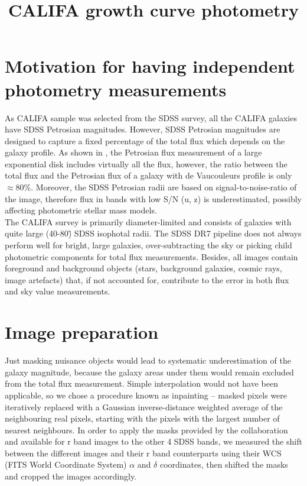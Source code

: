 \documentclass[apj, onecolumn]{emulateapj}
\title{CALIFA growth curve photometry}
\begin{document}
\maketitle
\section*{Motivation for having independent photometry measurements}

As CALIFA sample was selected from the SDSS survey, all the CALIFA galaxies have SDSS Petrosian magnitudes. However, SDSS Petrosian magnitudes are designed to capture a fixed percentage of the total flux which depends on the galaxy profile. As shown in \cite{Blanton2001}, the Petrosian flux measurement of a large exponential disk includes virtually all the flux, however, the ratio between the total flux and the Petrosian flux of a galaxy with de Vaucouleurs profile is only $\approx$80\%. Moreover, the SDSS Petrosian radii are based on signal-to-noise-ratio of the image, therefore flux in bands with low S/N (u, z) is underestimated, possibly affecting photometric stellar mass models.\\

The CALIFA survey is primarily diameter-limited and consists of galaxies with quite large (40-80\") SDSS isophotal radii. The SDSS DR7 pipeline does not always perform well for bright, large galaxies, over-subtracting the sky or picking child photometric components for total flux measurements. Besides, all images contain foreground and background objects (stars, background galaxies, cosmic rays, image artefacts) that, if not accounted for, contribute to the error in both flux and sky value measurements. 
\section*{Image preparation}
Just masking nuisance objects would lead to systematic underestimation of the galaxy magnitude, because the galaxy areas under them would remain excluded from the total flux measurement.
 Simple interpolation would not have been applicable, so we chose a procedure known as inpainting -- masked pixels were iteratively replaced with a Gaussian inverse-distance weighted average of the neighbouring real pixels, starting with the pixels with the largest number of nearest neighbours. In order to apply the masks provided by the collaboration and available for r band images to the other 4 SDSS bands, we measured the shift between the different images and their r band counterparts using their WCS (FITS World Coordinate System) $\alpha$ and $\delta$ coordinates, then shifted the masks and cropped the images accordingly.
\end{document}

